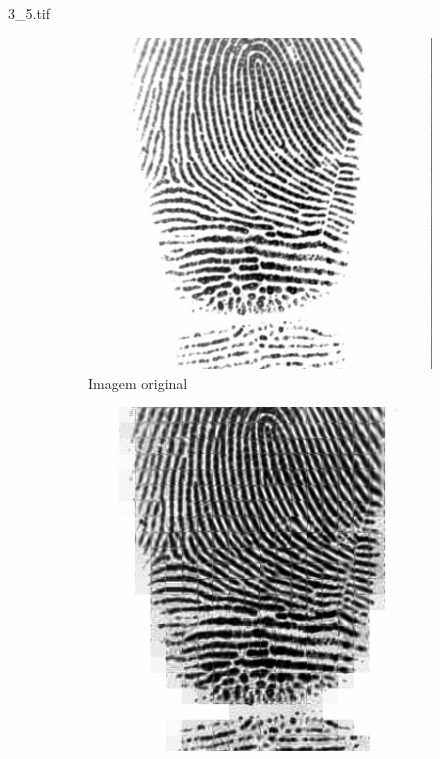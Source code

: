 \documentclass{beamer}
\begin{document}
    \begin{frame}{3\_5.tif}
        \begin{figure}
            \centering
            \begin{subfigure}[!ht]{0.32\textwidth}
                \includegraphics[width=\columnwidth]{Fingerprints/3_5.jpg}
                \caption{Imagem original}
            \end{subfigure}
            \begin{subfigure}[!ht]{0.32\textwidth}
                \includegraphics[width=\columnwidth]{Fingerprints/3_5_intermediate.jpg}

\end{subfigure}
\end{figure}
\end{frame}
\end{document}
